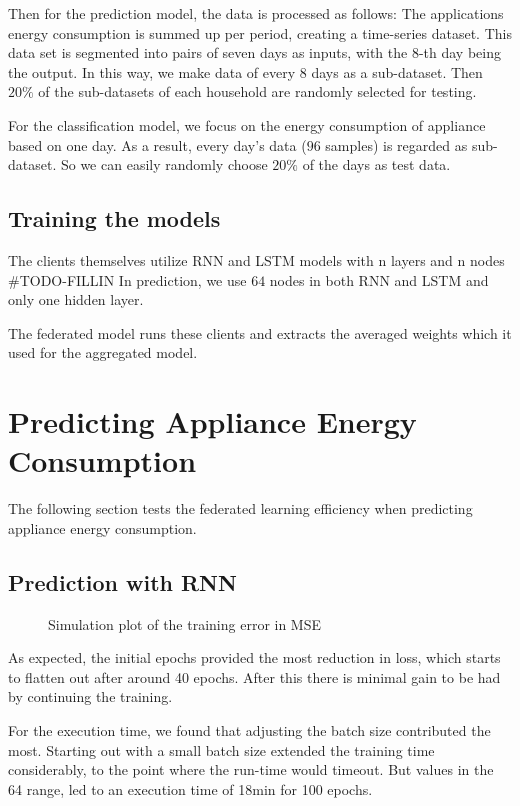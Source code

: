 \documentclass[a4paper, article, oneside, USenglish, IN5460]{memoir}
\begin{document}
Then for the prediction model, the data is processed as follows:
The applications energy consumption is summed up per period, creating a time-series dataset. This data set is segmented into pairs of seven days as inputs, with the $8$-th day being the output. In this way, we make data of every $8$ days as a sub-dataset. Then $20\%$ of the sub-datasets of each household are randomly selected for testing.

For the classification model, we focus on the energy consumption of appliance based on one day. As a result, every day's data ($96$ samples) is regarded as sub-dataset. So we can easily randomly choose $20\%$ of the days as test data.

\section{Training the models}

The clients themselves utilize RNN and LSTM models with n layers and n nodes #TODO-FILLIN
In prediction, we use $64$ nodes in both RNN and LSTM and only one hidden layer. 

The federated model runs these clients and extracts the averaged weights which it used for the aggregated model.



\chapter{Predicting Appliance Energy Consumption}

The following section tests the federated learning efficiency when predicting appliance energy consumption.

\section{Prediction with RNN}

\begin{figure}[H]
  \centering
    
  \caption{Simulation plot of the training error in MSE}
\end{figure}

As expected, the initial epochs provided the most reduction in loss, which starts to flatten out after around 40 epochs. After this there is minimal gain to be had by continuing the training. 

For the execution time, we found that adjusting the batch size contributed the most. Starting out with a small batch size extended the training time considerably, to the point where the run-time would timeout. But values in the 64 range, led to an execution time of 18min for 100 epochs.  
\end{document}
